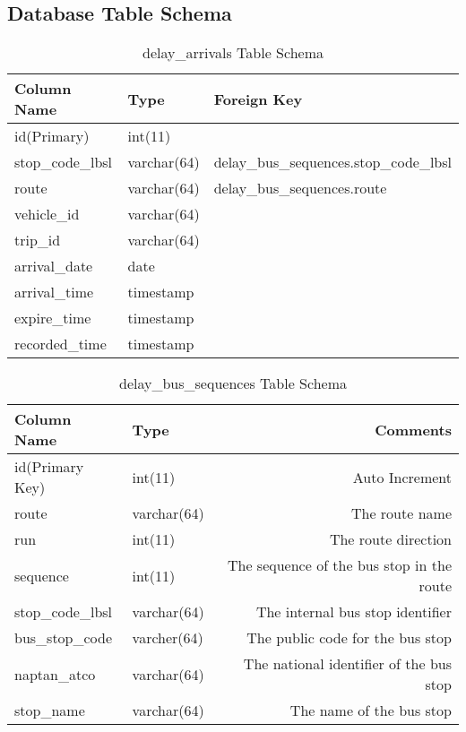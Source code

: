 \begin{appendices}
\chapter{Database Table Schema}
\begin{table}[h]
\centering
\begin{tabular}{@{}lll@{}} \toprule
Column Name & Type & Foreign Key\\ \midrule
id(Primary) & int(11)  \\
stop\_code\_lbsl & varchar(64) & delay\_bus\_sequences.stop\_code\_lbsl \\
route & varchar(64) & delay\_bus\_sequences.route \\
vehicle\_id & varchar(64) & \\
trip\_id & varchar(64) & \\
arrival\_date & date &  \\
arrival\_time & timestamp &  \\
expire\_time & timestamp & \\
recorded\_time & timestamp & \\ \bottomrule
\end{tabular}
\caption{delay\_arrivals Table Schema}
\label{table:delay_arrivals_schema}
\end{table}

\begin{table}
\centering
\begin{tabular}{@{}llr@{}} \toprule
Column Name & Type & Comments\\ \midrule
id(Primary Key) & int(11)  & Auto Increment\\
route & varchar(64) &  The route name\\
run & int(11) & The route direction\\
sequence & int(11) & The sequence of the bus stop in the route\\
stop\_code\_lbsl & varchar(64) & The internal bus stop identifier\\
bus\_stop\_code & varcher(64) & The public code for the bus stop\\
naptan\_atco & varchar(64) & The national identifier of the bus stop\\
stop\_name & varchar(64) & The name of the bus stop\\ \bottomrule
\end{tabular}
\caption{delay\_bus\_sequences Table Schema}
\label{table:delay_bus_sequences}
\end{table}



\end{appendices}
